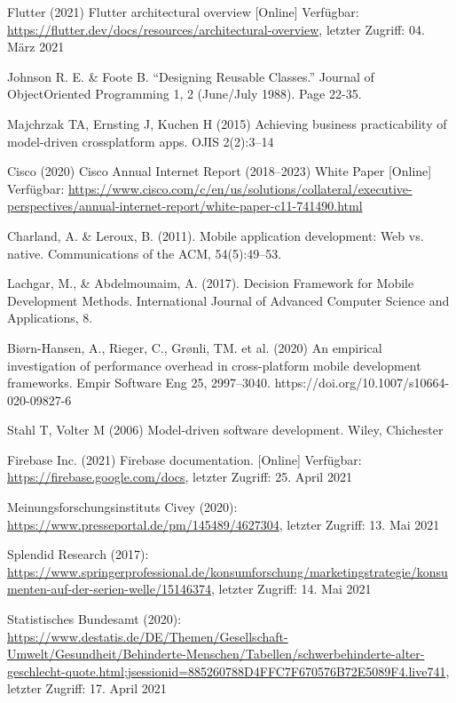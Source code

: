 \documentclass[11pt,a4paper]{article}
\begin{document}
\begin{itemize}
	 Flutter (2021) Flutter architectural overview [Online] Verfügbar: \url{https://flutter.dev/docs/resources/architectural-overview}, letzter Zugriff: 04. März 2021

	 Johnson R. E. \&  Foote B. “Designing Reusable Classes.” Journal of ObjectOriented Programming 1, 2 (June/July 1988). Page 22-35.

	 Majchrzak TA, Ernsting J, Kuchen H (2015) Achieving business practicability of model-driven crossplatform apps. OJIS 2(2):3–14

	 Cisco (2020) Cisco Annual Internet Report (2018–2023) White Paper [Online] Verfügbar: \url{https://www.cisco.com/c/en/us/solutions/collateral/executive-perspectives/annual-internet-report/white-paper-c11-741490.html}

	 Charland, A. \& Leroux, B. (2011). Mobile application development: Web vs. native. Communications of the ACM, 54(5):49–53.

	 Lachgar, M., \& Abdelmounaim, A. (2017). Decision Framework for Mobile Development Methods. International Journal of Advanced Computer Science and Applications, 8.

	 Biørn-Hansen, A., Rieger, C., Grønli, TM. et al. (2020) An empirical investigation of performance overhead in cross-platform mobile development frameworks. Empir Software Eng 25, 2997–3040. https://doi.org/10.1007/s10664-020-09827-6

	 Stahl T, Volter M (2006) Model-driven software development. Wiley, Chichester

	 Firebase Inc. (2021) Firebase documentation. [Online] Verfügbar: \url{https://firebase.google.com/docs}, letzter Zugriff: 25. April 2021

     Meinungsforschungsinstituts Civey (2020):  \url{https://www.presseportal.de/pm/145489/4627304}, letzter Zugriff: 13. Mai 2021

     Splendid Research (2017): \url{https://www.springerprofessional.de/konsumforschung/marketingstrategie/konsumenten-auf-der-serien-welle/15146374}, letzter Zugriff: 14. Mai 2021

     Statistisches Bundesamt (2020): \url{https://www.destatis.de/DE/Themen/Gesellschaft-Umwelt/Gesundheit/Behinderte-Menschen/Tabellen/schwerbehinderte-alter-geschlecht-quote.html;jsessionid=885260788D4FFC7F670576B72E5089F4.live741}, letzter Zugriff: 17. April 2021


\end{itemize}
\end{document}
